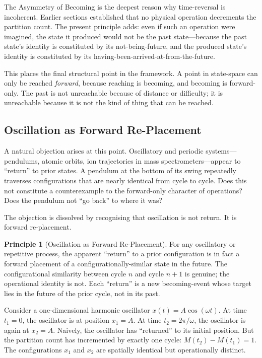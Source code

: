 \documentclass[twocolumn,10pt,a4paper]{article}
\theoremstyle{definition}
\newtheorem{principle}[theorem]{Principle}
\theoremstyle{remark}
\newcommand{\Mcount}{M}
\begin{document}
The Asymmetry of Becoming is the deepest reason why time-reversal is incoherent. Earlier sections established that no physical operation decrements the partition count. The present principle adds: even if such an operation were imagined, the state it produced would not be the past state---because the past state's identity is constituted by its not-being-future, and the produced state's identity is constituted by its having-been-arrived-at-from-the-future.

This places the final structural point in the framework. A point in state-space can only be reached \emph{forward}, because reaching is becoming, and becoming is forward-only. The past is not unreachable because of distance or difficulty; it is unreachable because it is not the kind of thing that can be reached.

\subsection{Oscillation as Forward Re-Placement}
\label{sec:oscillation-forward}

A natural objection arises at this point. Oscillatory and periodic systems---pendulums, atomic orbits, ion trajectories in mass spectrometers---appear to ``return'' to prior states. A pendulum at the bottom of its swing repeatedly traverses configurations that are nearly identical from cycle to cycle. Does this not constitute a counterexample to the forward-only character of operations? Does the pendulum not ``go back'' to where it was?

The objection is dissolved by recognising that oscillation is not return. It is forward re-placement.

\begin{principle}[Oscillation as Forward Re-Placement]
\label{princ:oscillation}
For any oscillatory or repetitive process, the apparent ``return'' to a prior configuration is in fact a forward placement of a configurationally-similar state in the future. The configurational similarity between cycle $n$ and cycle $n+1$ is genuine; the operational identity is not. Each ``return'' is a new becoming-event whose target lies in the future of the prior cycle, not in its past.
\end{principle}

Consider a one-dimensional harmonic oscillator $x(t) = A \cos(\omega t)$. At time $t_1 = 0$, the oscillator is at position $x_1 = A$. At time $t_2 = 2\pi/\omega$, the oscillator is again at $x_2 = A$. Naively, the oscillator has ``returned'' to its initial position. But the partition count has incremented by exactly one cycle: $\Mcount(t_2) - \Mcount(t_1) = 1$. The configurations $x_1$ and $x_2$ are spatially identical but operationally distinct.
\end{document}
